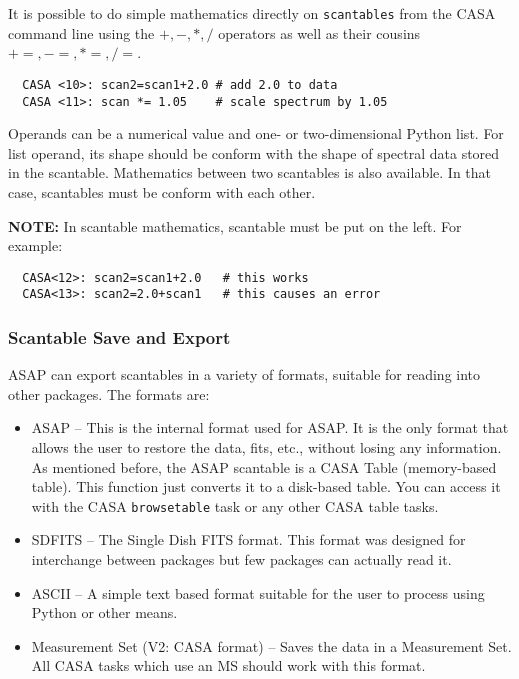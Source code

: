 It is possible to do simple mathematics directly on {\tt scantables}
from the CASA command line using the $+,-,*,/$ operators as well as
their cousins $+=, -=, *=, /=$.  

\small
\begin{verbatim}
  CASA <10>: scan2=scan1+2.0 # add 2.0 to data 
  CASA <11>: scan *= 1.05    # scale spectrum by 1.05 
\end{verbatim}
\normalsize

Operands can be
a numerical value and one- or two-dimensional Python list. For list
operand, its shape should be conform with the shape of spectral data stored in the scantable.
Mathematics between two scantables is also available. In that case,
scantables must be conform with each other.

{\bf NOTE:} In scantable mathematics, scantable must be put on the left.
For example:
\begin{verbatim}
  CASA<12>: scan2=scan1+2.0   # this works
  CASA<13>: scan2=2.0+scan1   # this causes an error
\end{verbatim}


\subsubsection{Scantable Save and Export}
\label{subsubsection:sd.asap.scantable.export}

ASAP can export scantables in a variety of formats, suitable for reading
into other packages. The formats are: 

\begin{itemize}
    \item ASAP -- This is the internal format used for ASAP. It is the only
     format that allows the user to restore the data, fits, etc.,
     without losing any information. As mentioned before, the ASAP
     scantable is a CASA Table (memory-based table). This function
     just converts it to a disk-based table. You can access it with
     the CASA {\tt browsetable} task or any other CASA table tasks. 

   \item SDFITS -- The Single Dish FITS format. This format was designed
     for interchange between packages but few packages can actually
     read it. 

   \item ASCII -- A simple text based format suitable for the user to
     process using Python or other means. 

   \item Measurement Set (V2: CASA format) -- Saves the data in a
     Measurement Set. All CASA tasks which use an MS should work with this format.
\end{itemize}

